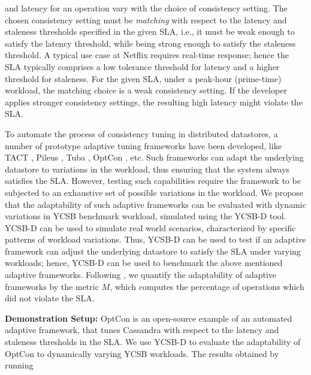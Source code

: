 \documentclass[conference]{IEEEtran}
\begin{document}
    and latency for an operation vary with the choice of consistency setting. The chosen consistency setting must be \emph{matching} with respect to the latency and staleness thresholds specified in the
 given SLA, i.e., it must be weak enough to satisfy the latency threshold, while being strong enough to satisfy the staleness threshold. A typical use case at Netflix \cite{NetflixWorkload-Variation} requires real-time response; hence the SLA
      typically comprises a low tolerance threshold for latency and a higher threshold for staleness. For the given SLA, under a peak-hour (prime-time) workload,
      the matching choice is a weak consistency setting. If the developer applies stronger consistency settings, the resulting high latency might violate the SLA.
 \par  To automate the process of consistency tuning in distributed datastores, a number of prototype
  adaptive tuning frameworks have been developed, like TACT \cite{conf/wecwis/YuV00}, Pileus \cite{Terry:2013:CSL:2517349.2522731}, Tuba \cite{Ardekani:2014:SGC:2685048.2685077}, %
   OptCon \cite{OptCOnCCGRid2016}, etc.
     Such frameworks can adapt the underlying datastore to variations in the workload, thus ensuring that the system always satisfies the SLA.
 However, testing such capabilities require the framework to be subjected to an exhaustive set of possible
 variations in the workload.
  We propose that the adaptability of such adaptive frameworks can be evaluated with dynamic variations in YCSB benchmark workload, simulated using the YCSB-D tool.
  YCSB-D can be used to simulate real world scenarios, characterized by specific patterns of workload variations.
  Thus, YCSB-D can be used to test if an adaptive framework can adjust the underlying datastore to satisfy the
  SLA under varying workloads; hence, YCSB-D can be used to benchmark the above mentioned adaptive frameworks.
  Following \cite{Terry:2013:CSL:2517349.2522731}, we quantify the adaptability of adaptive frameworks by the metric \emph{$M$}, which computes the percentage of operations which did not violate the SLA. %
 \par \textbf{Demonstration  Setup:}
 OptCon \cite{OptCOnCCGRid2016} is an open-source example of an automated adaptive framework, that tunes Cassandra with respect to the latency and staleness thresholds in the SLA.
 We use YCSB-D to evaluate the adaptability of OptCon to dynamically varying YCSB workloads. The results obtained by running
\end{document}
